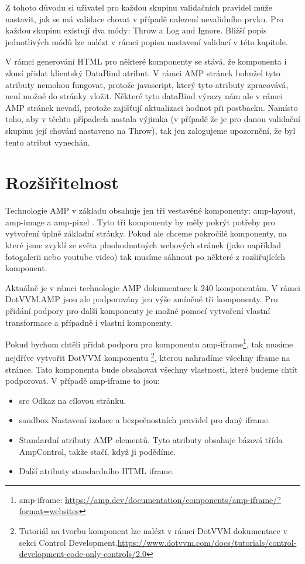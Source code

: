 Z tohoto důvodu si uživatel pro každou skupinu validačních pravidel může nastavit, jak se má validace chovat v případě nalezení nevalidního prvku. Pro každou skupinu existují dva módy: Throw a Log and Ignore. Bližší popis jednotlivých módů lze nalézt v rámci popisu nastavení validací v této kapitole.

V rámci generování HTML pro některé komponenty se stává, že komponenta i zkusí přidat klientský DataBind atribut. V rámci AMP stránek bohužel tyto atributy nemohou fungovat, protože javascript, který tyto atributy zpracovává, není možné do stránky vložit. Některé tyto dataBind výrazy nám ale v rámci AMP stránek nevadí, protože zajišťují aktualizaci hodnot při postbacku. Namísto toho, aby v těchto případech nastala výjimka (v případě že je pro danou validační skupinu její chování nastaveno na Throw), tak jen zalogujeme upozornění, že byl tento atribut vynechán.

\section{Rozšiřitelnost}
Technologie AMP v základu obsahuje jen tři vestavěné komponenty: amp-layout, amp-image a amp-pixel \cite[Ch.\ 3, p.\ 160]{VzhuruDoAMP}. Tyto tři komponenty by měly pokrýt potřeby pro vytvoření úplně základní stránky. Pokud ale chceme pokročilé komponenty, na které jsme zvyklí ze světa plnohodnotných webových stránek (jako například fotogalerii nebo youtube video) tak musíme sáhnout po některé z rozšiřujících komponent.

Aktuálně je v rámci technologie AMP dokumentace k 240 komponentám. V rámci DotVVM.AMP jsou ale podporovány jen výše zmíněné tři komponenty. Pro přidání podpory pro další komponenty je možné pomocí vytvoření vlastní transformace a případně i vlastní komponenty.

Pokud bychom chtěli přidat podporu pro komponentu amp-iframe\footnote{amp-iframe: \url{https://amp.dev/documentation/components/amp-iframe/?format=websites}}, tak musíme nejdříve vytvořit DotVVM komponentu \footnote{Tutoriál na tvorbu komponent lze nalézt v rámci DotVVM dokumentace v sekci Control Development.\newline \url{https://www.dotvvm.com/docs/tutorials/control-development-code-only-controls/2.0}}, kterou nahradíme všechny iframe na stránce. Tato komponenta bude obsahovat všechny vlastnosti, které budeme chtít podporovat. V případě amp-iframe to jsou:
\begin{itemize}
    \item src\newline
    Odkaz na cílovou stránku.
    \item sandbox\newline
    Nastavení izolace a bezpečnostních pravidel pro daný iframe.
    \item Standardní atributy AMP elementů.\newline
    Tyto atributy obsahuje bázová třída AmpControl, takže stačí, když ji podědíme.
    \item Další atributy standardního HTML iframe.
\end{itemize}

